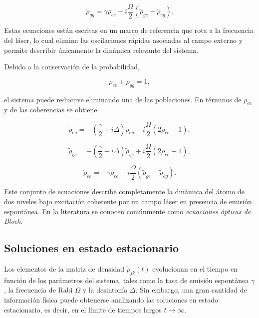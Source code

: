 \documentclass[11pt]{report}
\begin{document}
\begin{equation}
\dot{\rho}_{gg}
=
\gamma \rho_{ee}
-
i\frac{\Omega}{2}
(\tilde{\rho}_{ge}-\tilde{\rho}_{eg}).
\end{equation}

Estas ecuaciones están escritas en un marco de referencia que rota a la frecuencia del láser, lo cual elimina las oscilaciones rápidas asociadas al campo externo y permite describir únicamente la dinámica relevante del sistema.

Debido a la conservación de la probabilidad,

\begin{equation}
\rho_{ee}+\rho_{gg}=1,
\end{equation}

el sistema puede reducirse eliminando una de las poblaciones. En términos de $\rho_{ee}$ y de las coherencias se obtiene

\begin{equation}
\dot{\tilde{\rho}}_{eg}
=
-\left(
\frac{\gamma}{2}+i\Delta
\right)
\tilde{\rho}_{eg}
-
i\frac{\Omega}{2}
(2\rho_{ee}-1),
\end{equation}

\begin{equation}
\dot{\tilde{\rho}}_{ge}
=
-\left(
\frac{\gamma}{2}-i\Delta
\right)
\tilde{\rho}_{ge}
+
i\frac{\Omega}{2}
(2\rho_{ee}-1),
\end{equation}

\begin{equation}
\dot{\rho}_{ee}
=
-\gamma \rho_{ee}
+
i\frac{\Omega}{2}
(\tilde{\rho}_{ge}-\tilde{\rho}_{eg}).
\end{equation}

Este conjunto de ecuaciones describe completamente la dinámica del átomo de dos niveles bajo excitación coherente por un campo láser en presencia de emisión espontánea. En la literatura se conocen comúnmente como \textit{ecuaciones ópticas de Bloch}.

\subsection{Soluciones en estado estacionario}

Los elementos de la matriz de densidad $\tilde{\rho}_{jk}(t)$ evolucionan en el tiempo en función de los parámetros del sistema, tales como la tasa de emisión espontánea $\gamma$, la frecuencia de Rabi $\Omega$ y la desintonía $\Delta$. Sin embargo, una gran cantidad de información física puede obtenerse analizando las soluciones en estado estacionario, es decir, en el límite de tiempos largos $t \rightarrow \infty$.
\end{document}

